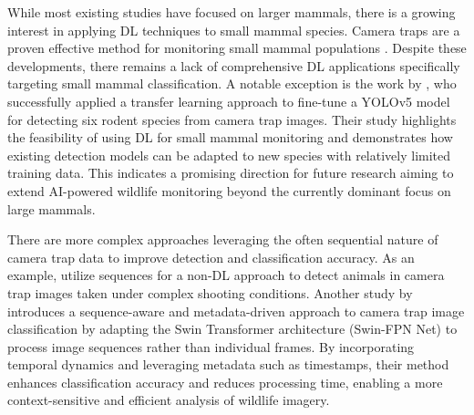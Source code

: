 While most existing studies have focused on larger mammals, there is a growing interest in applying \ac{DL} techniques to small mammal species.
Camera traps are a proven effective method for monitoring small mammal populations \autocite{clucasCameraTrapMethod2025,aegerterMonitoringKleinmustelidenSchlaefern2019,littlewoodUseNovelCamera2021}.
Despite these developments, there remains a lack of comprehensive \ac{DL} applications specifically targeting small mammal classification.
A notable exception is the work by \textcite{hopkinsDetectingMonitoringRodents2024}, who successfully applied a transfer learning approach to fine-tune a YOLOv5 model for detecting six rodent species from camera trap images.
Their study highlights the feasibility of using \ac{DL} for small mammal monitoring and demonstrates how existing detection models can be adapted to new species with relatively limited training data.
This indicates a promising direction for future research aiming to extend \ac{AI}-powered wildlife monitoring beyond the currently dominant focus on large mammals.

There are more complex approaches leveraging the often sequential nature of camera trap data to improve detection and classification accuracy.
As an example, \textcite{zotinANIMALDETECTIONUSING2019} utilize sequences for a non-\ac{DL} approach to detect animals in camera trap images taken under complex shooting conditions.
Another study by \textcite{muhammadTemporalSwinFPNNetNovel2024} introduces a sequence-aware and metadata-driven approach to camera trap image classification by adapting the Swin Transformer architecture (Swin-FPN Net) to process image sequences rather than individual frames.
By incorporating temporal dynamics and leveraging metadata such as timestamps, their method enhances classification accuracy and reduces processing time, enabling a more context-sensitive and efficient analysis of wildlife imagery.

